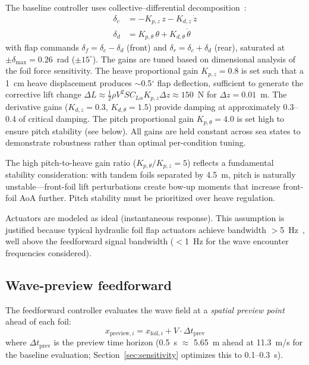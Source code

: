 \documentclass[review]{elsarticle}
\begin{document}
The baseline controller uses collective--differential
decomposition~\citep{giron2001}:
\begin{align}
  \delta_c &= -K_{p,z}\, z - K_{d,z}\, \dot{z}
  \label{eq:collective} \\
  \delta_d &= K_{p,\theta}\, \theta + K_{d,\theta}\, \dot{\theta}
  \label{eq:differential}
\end{align}
with flap commands $\delta_f = \delta_c - \delta_d$ (front) and
$\delta_r = \delta_c + \delta_d$ (rear), saturated at
$\pm \delta_{\max} = 0.26$~rad ($\pm 15^\circ$).
The gains are tuned based on dimensional analysis of the foil
force sensitivity.
The heave proportional gain $K_{p,z}=0.8$ is set such that a
1~cm heave displacement produces $\sim$0.5$^\circ$ flap deflection,
sufficient to generate the corrective lift change
$\Delta L \approx \frac{1}{2}\rho V^2 S C_{L\alpha} K_{p,z} \Delta z
\approx 150$~N for $\Delta z = 0.01$~m.
The derivative gains ($K_{d,z}=0.3$, $K_{d,\theta}=1.5$) provide
damping at approximately 0.3--0.4 of critical damping.
The pitch proportional gain $K_{p,\theta}=4.0$ is set high to
ensure pitch stability (see below).
All gains are held constant across sea states to demonstrate
robustness rather than optimal per-condition tuning.

The high pitch-to-heave gain ratio ($K_{p,\theta}/K_{p,z} = 5$) reflects
a fundamental stability consideration: with tandem foils separated
by 4.5~m, pitch is naturally unstable---front-foil lift perturbations
create bow-up moments that increase front-foil AoA further.
Pitch stability must be prioritized over heave regulation.

Actuators are modeled as ideal (instantaneous response).
This assumption is justified because typical hydraulic foil flap
actuators achieve bandwidth $>$5~Hz~\citep{haywood1995},
well above the feedforward signal bandwidth ($<$1~Hz for the
wave encounter frequencies considered).

\subsection{Wave-preview feedforward}

The feedforward controller evaluates the wave field at a
\emph{spatial preview point} ahead of each foil:
\begin{equation}
  x_{\text{preview},i} = x_{\text{foil},i} + V \cdot \Delta t_{\text{prev}}
  \label{eq:preview}
\end{equation}
where $\Delta t_{\text{prev}}$ is the preview time horizon
(0.5~s $\approx$ 5.65~m ahead at 11.3~m/s for the baseline evaluation;
Section~\ref{sec:sensitivity} optimizes this to 0.1--0.3~s).
\end{document}
